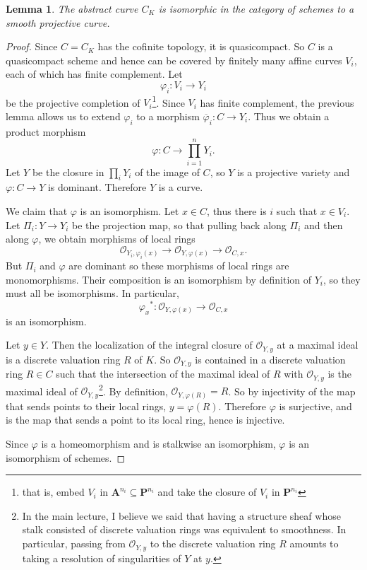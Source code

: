 \documentclass[reqno,12pt,letterpaper]{amsart}
\newcommand{\PP}{\mathbf P}
\newcommand{\Aff}{\mathbf A}
\newcommand{\Olo}{\mathscr O}
\newtheorem{lemma}[theorem]{Lemma}
\theoremstyle{definition}
\begin{document}
\begin{lemma}
The abstract curve $C_K$ is isomorphic in the category of schemes to a smooth projective curve.
\end{lemma}
\begin{proof}
Since $C = C_K$ has the cofinite topology, it is quasicompact.
So $C$ is a quasicompact scheme and hence can be covered by finitely many affine curves $V_i$, each of which has finite complement.
Let
$$\varphi_i: V_i \to Y_i$$
be the projective completion of $V_i$\footnote{that is, embed $V_i$ in $\Aff^{n_i} \subseteq \PP^{n_i}$ and take the closure of $V_i$ in $\PP^{n_i}$}.
Since $V_i$ has finite complement, the previous lemma allows us to extend $\varphi_i$ to a morphism $\overline \varphi_i: C \to Y_i$.
Thus we obtain a product morphism
$$\varphi: C \to \prod_{i=1}^n Y_i.$$
Let $Y$ be the closure in $\prod_i Y_i$ of the image of $C$, so $Y$ is a projective variety and $\varphi: C \to Y$ is dominant.
Therefore $Y$ is a curve.

We claim that $\varphi$ is an isomorphism.
Let $x \in C$, thus there is $i$ such that $x \in V_i$. Let $\Pi_i: Y \to Y_i$ be the projection map, so that pulling back along $\Pi_i$ and then along $\varphi$, we obtain morphisms of local rings
$$\Olo_{Y_i, \varphi_i(x)} \to \Olo_{Y, \varphi(x)} \to \Olo_{C, x}.$$
But $\Pi_i$ and $\varphi$ are dominant so these morphisms of local rings are monomorphisms.
Their composition is an isomorphism by definition of $Y_i$, so they must all be isomorphisms.
In particular,
$${\varphi_x}^* : \Olo_{Y, \varphi(x)} \to \Olo_{C, x}$$
is an isomorphism.

Let $y \in Y$. Then the localization of the integral closure of $\Olo_{Y, y}$ at a maximal ideal is a discrete valuation ring $R$ of $K$.
So $\Olo_{Y, y}$ is contained in a discrete valuation ring $R \in C$ such that the intersection of the maximal ideal of $R$ with $\Olo_{Y, y}$ is the maximal ideal of $\Olo_{Y, y}$\footnote{In the main lecture,
I believe we said that having a structure sheaf whose stalk consisted of discrete valuation rings was equivalent to smoothness.
In particular, passing from $\Olo_{Y, y}$ to the discrete valuation ring $R$ amounts to taking a resolution of singularities of $Y$ at $y$.}.
By definition, $\Olo_{Y, \varphi(R)} = R$. So by injectivity of the map that sends points to their local rings, $y = \varphi(R)$.
Therefore $\varphi$ is surjective, and is the map that sends a point to its local ring, hence is injective.

Since $\varphi$ is a homeomorphism and is stalkwise an isomorphism, $\varphi$ is an isomorphism of schemes.
\end{proof}
\end{document}
